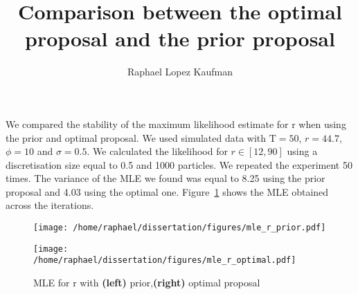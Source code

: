 \documentclass{article}
\title{Comparison between the optimal proposal and the prior proposal}
\author{Raphael Lopez Kaufman}
\date{}
\begin{document}
We compared the stability of the maximum likelihood estimate for r when using the prior and optimal proposal. We used simulated data with $\mathrm{T}=50$, $r=44.7$, $\phi=10$ and $\sigma=0.5$. We calculated the likelihood for $r \in [12, 90]$ using a discretisation size equal to 0.5 and 1000 particles. We repeated the experiment 50 times. The variance of the MLE we found was equal to 8.25 using the prior proposal and 4.03 using the optimal one. Figure~\ref{fig:comparison} shows the MLE obtained across the iterations.

\begin{figure}[htb]
	\centering
	\begin{minipage}{0.9\textwidth}
		\centering
		\texttt{[image: /home/raphael/dissertation/figures/mle\_r\_prior.pdf]}
	\end{minipage}
	\begin{minipage}{.9\textwidth}
		\centering
		\texttt{[image: /home/raphael/dissertation/figures/mle\_r\_optimal.pdf]}
	\end{minipage}
	\caption{MLE for r with \textbf{(left)} prior,\textbf{(right)} optimal proposal}
	\label{fig:comparison}
\end{figure}
	
\end{document}
